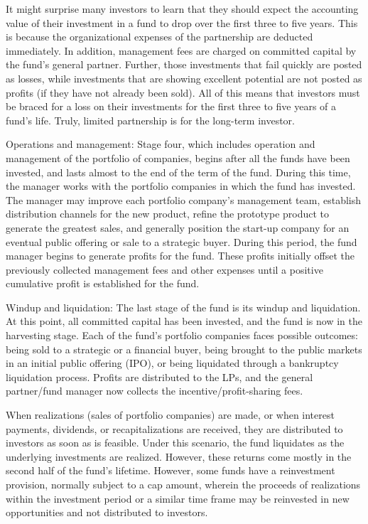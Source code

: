 \documentclass[11pt]{article}
\begin{document}
It might surprise many investors to learn that they should expect the accounting value of their investment in a fund to drop over the first three to five years. This is because the organizational expenses of the partnership are deducted immediately. In addition, management fees are charged on committed capital by the fund's general partner. Further, those investments that fail quickly are posted as losses, while investments that are showing excellent potential are not posted as profits (if they have not already been sold). All of this means that investors must be braced for a loss on their investments for the first three to five years of a fund's life. Truly, limited partnership is for the long-term investor.

Operations and management: Stage four, which includes operation and management of the portfolio of companies, begins after all the funds have been invested, and lasts almost to the end of the term of the fund. During this time, the manager works with the portfolio companies in which the fund has invested. The manager may improve each portfolio company's management team, establish distribution channels for the new product, refine the prototype product to generate the greatest sales, and generally position the start-up company for an eventual public offering or sale to a strategic buyer. During this period, the fund manager begins to generate profits for the fund. These profits initially offset the previously collected management fees and other expenses until a positive cumulative profit is established for the fund.

Windup and liquidation: The last stage of the fund is its windup and liquidation. At this point, all committed capital has been invested, and the fund is now in the harvesting stage. Each of the fund's portfolio companies faces possible outcomes: being sold to a strategic or a financial buyer, being brought to the public markets in an initial public offering (IPO), or being liquidated through a bankruptcy liquidation process. Profits are distributed to the LPs, and the general partner/fund manager now collects the incentive/profit-sharing fees.

When realizations (sales of portfolio companies) are made, or when interest payments, dividends, or recapitalizations are received, they are distributed to investors as soon as is feasible. Under this scenario, the fund liquidates as the underlying investments are realized. However, these returns come mostly in the second half of the fund's lifetime. However, some funds have a reinvestment provision, normally subject to a cap amount, wherein the proceeds of realizations within the investment period or a similar time frame may be reinvested in new opportunities and not distributed to investors.
\end{document}
